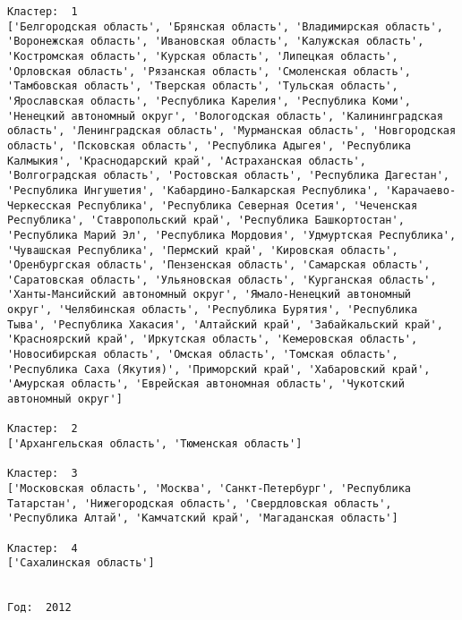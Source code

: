 \documentclass[11pt]{article}
\begin{document}
\begin{Verbatim}[commandchars=\\\{\}]
Кластер:  1
['Белгородская область', 'Брянская область', 'Владимирская область', 'Воронежская область', 'Ивановская область', 'Калужская область', 'Костромская область', 'Курская область', 'Липецкая область', 'Орловская область', 'Рязанская область', 'Смоленская область', 'Тамбовская область', 'Тверская область', 'Тульская область', 'Ярославская область', 'Республика Карелия', 'Республика Коми', 'Ненецкий автономный округ', 'Вологодская область', 'Калинингpадская область', 'Ленинградская область', 'Мурманская область', 'Новгородская область', 'Псковская область', 'Республика Адыгея', 'Республика Калмыкия', 'Краснодарский край', 'Астраханская область', 'Волгоградская область', 'Ростовская область', 'Республика Дагестан', 'Республика Ингушетия', 'Кабардино-Балкарская Республика', 'Карачаево-Черкесская Республика', 'Республика Северная Осетия', 'Чеченская Республика', 'Ставропольский край', 'Республика Башкортостан', 'Республика Марий Эл', 'Республика Мордовия', 'Удмуртская Республика', 'Чувашская Республика', 'Пермский край', 'Кировская область', 'Оренбургская область', 'Пензенская область', 'Самарская область', 'Саратовская область', 'Ульяновская область', 'Курганская область', 'Ханты-Мансийский автономный округ', 'Ямало-Ненецкий автономный округ', 'Челябинская область', 'Республика Бурятия', 'Республика Тыва', 'Республика Хакасия', 'Алтайский край', 'Забайкальский край', 'Красноярский край', 'Иркутская область', 'Кемеровская область', 'Новосибирская область', 'Омская область', 'Томская область', 'Республика Саха (Якутия)', 'Приморский край', 'Хабаровский край', 'Амурская область', 'Еврейская автономная область', 'Чукотский автономный округ']

Кластер:  2
['Архангельская область', 'Тюменская область']

Кластер:  3
['Московская область', 'Москва', 'Санкт-Петербург', 'Республика Татарстан', 'Нижегородская область', 'Свердловская область', 'Республика Алтай', 'Камчатский край', 'Магаданская область']

Кластер:  4
['Сахалинская область']


Год:  2012


\end{Verbatim}
\end{document}
